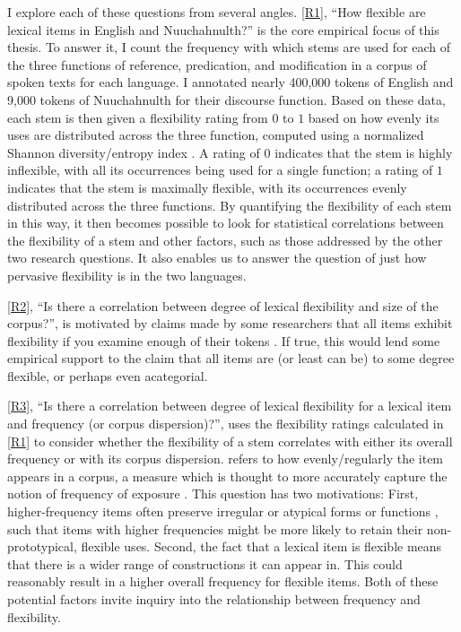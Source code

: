 I explore each of these questions from several angles. \ref{R1}, \enquote{How flexible are lexical items in English and Nuuchahnulth?} is the core empirical focus of this thesis. To answer it, I count the frequency with which stems are used for each of the three functions of reference, predication, and modification in a corpus of spoken texts for each language. I annotated nearly 400,000 tokens of English and 9,000 tokens of Nuuchahnulth for their discourse function. Based on these data, each stem is then given a flexibility rating from $0$ to $1$ based on how evenly its uses are distributed across the three function, computed using a normalized Shannon diversity/entropy index \parencite{Shannon1948}. A rating of $0$ indicates that the stem is highly inflexible, with all its occurrences being used for a single function; a rating of $1$ indicates that the stem is maximally flexible, with its occurrences evenly distributed across the three functions. By quantifying the flexibility of each stem in this way, it then becomes possible to look for statistical correlations between the flexibility of a stem and other factors, such as those addressed by the other two research questions. It also enables us to answer the question of just how pervasive flexibility is in the two languages.

\ref{R2}, \enquote{Is there a correlation between degree of lexical flexibility and size of the corpus?}, is motivated by claims made by some researchers that all items exhibit flexibility if you examine enough of their tokens \parencite[77]{MoselHovdhaugen1992}. If true, this would lend some empirical support to the claim that all items are (or least can be) to some degree flexible, or perhaps even acategorial.

\ref{R3}, \enquote{Is there a correlation between degree of lexical flexibility for a lexical item and frequency (or corpus dispersion)?}, uses the flexibility ratings calculated in \ref{R1} to consider whether the flexibility of a stem correlates with either its overall frequency or with its corpus dispersion.  refers to how evenly/regularly the item appears in a corpus, a measure which is thought to more accurately capture the notion of frequency of exposure \parencites{Gries2008}{Griesfc}. This question has two motivations: First, higher-frequency items often preserve irregular or atypical forms or functions \parencite[Ch.~13]{Bybee2007}, such that items with higher frequencies might be more likely to retain their non-prototypical, flexible uses. Second, the fact that a lexical item is flexible means that there is a wider range of constructions it can appear in. This could reasonably result in a higher overall frequency for flexible items. Both of these potential factors invite inquiry into the relationship between frequency and flexibility.

